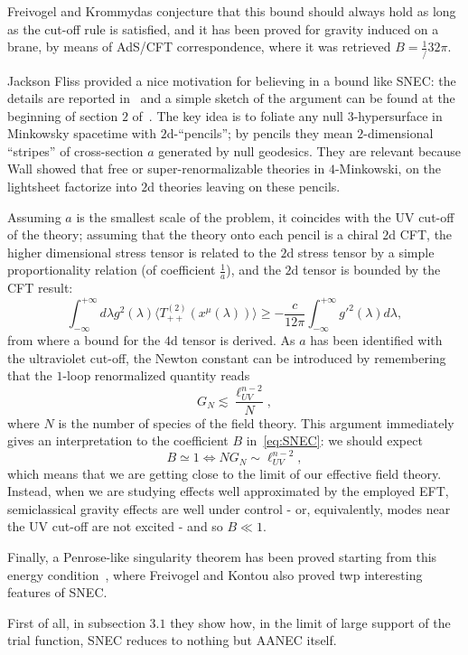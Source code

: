 Freivogel and Krommydas conjecture that this bound should always hold as long as the cut-off rule is satisfied, and it has been proved for gravity induced on a brane, by means of AdS/CFT correspondence, where it was retrieved \(B = \frac{1}/{32\pi}\).

Jackson Fliss provided a nice motivation for believing in a bound like SNEC: the details are reported in~\cite[]{fliss2022semi} and a simple sketch of the argument can be found at the beginning of section \(2\) of~\cite[]{freivogel2020return}. The key idea is to foliate any null \(3\)-hypersurface in Minkowsky spacetime with \(2\)d-``pencils''; by pencils they mean \(2\)-dimensional ``stripes'' of cross-section \(a\) generated by null geodesics. They are relevant because Wall showed that free or super-renormalizable theories in \(4\)-Minkowski, on the lightsheet factorize into \(2\)d theories leaving on these pencils.

Assuming \(a\) is the smallest scale of the problem, it coincides with the UV cut-off of the theory; assuming that the theory onto each pencil is a chiral \(2\)d CFT, the higher dimensional stress tensor is related to the \(2\)d stress tensor by a simple proportionality relation (of coefficient \(\frac{1}{a}\)), and the \(2\)d tensor is bounded by the CFT result:
\[
    \int_{-\infty}^{+\infty} d\lambda g^2(\lambda) \langle T^{(2)}_{++}(x^{\mu}(\lambda))\rangle \ge -\frac{c}{12\pi}\int_{-\infty}^{+\infty} g'^2(\lambda) d\lambda,
\]
from where a bound for the \(4\)d tensor is derived.
As \(a\) has been identified with the ultraviolet cut-off, the Newton constant can be introduced by remembering that the \(1\)-loop renormalized quantity reads
\[
G_N \lesssim \frac{\ell_{UV}^{n - 2}}{N},    
\]
where \(N\) is the number of species of the field theory.
This argument immediately gives an interpretation to the coefficient \(B\) in~\eqref{eq:SNEC}: we should expect
\[
B \simeq 1 \iff NG_N \sim  \ell_{UV}^{n - 2},  
\]
which means that we are getting close to the limit of our effective field theory. Instead, when we are studying effects well approximated by the employed EFT, semiclassical gravity effects are well under control - or, equivalently, modes near the UV cut-off are not excited - and so \(B \ll 1\).

Finally, a Penrose-like singularity theorem has been proved starting from this energy condition~\cite[]{freivogel2020return}, where Freivogel and Kontou also proved twp interesting features of SNEC. 

\noindent First of all, in subsection \(3.1\) they show how, in the limit of large support of the trial function, SNEC reduces to nothing but AANEC itself.

